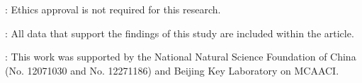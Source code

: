 \documentclass[12pt]{article}
\theoremstyle{plain}
\theoremstyle{definition}
\numberwithin{equation}{section}
\begin{document}
:
Ethics approval is not required for this research.


:
All data that support the findings of this study are included within the article. %

: This work was supported by the National Natural Science Foundation of China (No. 12071030 and  No. 12271186) and  Beijing Key Laboratory on MCAACI.


\end{document}
